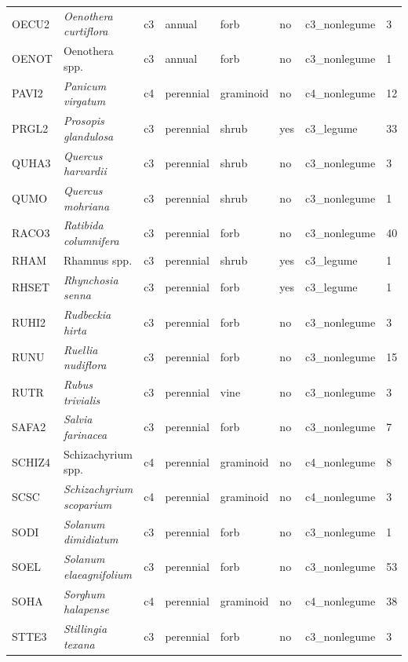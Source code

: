 \begin{landscape}
\begin{table}[]
{\begin{tabular}{p{2cm}p{5cm}p{2cm}p{2cm}p{2cm}p{2cm}p{3.5cm}p{2cm}}
        OECU2  & \textit{Oenothera curtiflora}      & c3 & annual    & forb           & no  & c3\_nonlegume & 3  \\
        OENOT  & Oenothera spp.                     & c3 & annual    & forb           & no  & c3\_nonlegume & 1  \\
        PAVI2  & \textit{Panicum virgatum}          & c4 & perennial & graminoid      & no  & c4\_nonlegume & 12 \\
        PRGL2  & \textit{Prosopis glandulosa}       & c3 & perennial & shrub          & yes & c3\_legume    & 33 \\
        QUHA3  & \textit{Quercus harvardii}         & c3 & perennial & shrub          & no  & c3\_nonlegume & 3  \\
        QUMO   & \textit{Quercus mohriana}          & c3 & perennial & shrub          & no  & c3\_nonlegume & 1  \\
        RACO3  & \textit{Ratibida columnifera}      & c3 & perennial & forb           & no  & c3\_nonlegume & 40 \\
        RHAM   & Rhamnus spp.                       & c3 & perennial & shrub          & yes & c3\_legume    & 1  \\
        RHSET  & \textit{Rhynchosia senna}          & c3 & perennial & forb           & yes & c3\_legume    & 1  \\
        RUHI2  & \textit{Rudbeckia hirta}           & c3 & perennial & forb           & no  & c3\_nonlegume & 3  \\
        RUNU   & \textit{Ruellia nudiflora}         & c3 & perennial & forb           & no  & c3\_nonlegume & 15 \\
        RUTR   & \textit{Rubus trivialis}           & c3 & perennial & vine           & no  & c3\_nonlegume & 3  \\
        SAFA2  & \textit{Salvia farinacea}          & c3 & perennial & forb           & no  & c3\_nonlegume & 7  \\
        SCHIZ4 & Schizachyrium spp.                 & c4 & perennial & graminoid      & no  & c4\_nonlegume & 8  \\
        SCSC   & \textit{Schizachyrium scoparium}   & c4 & perennial & graminoid      & no  & c4\_nonlegume & 3  \\
        SODI   & \textit{Solanum dimidiatum}        & c3 & perennial & forb           & no  & c3\_nonlegume & 1  \\
        SOEL   & \textit{Solanum elaeagnifolium}    & c3 & perennial & forb           & no  & c3\_nonlegume & 53 \\
        SOHA   & \textit{Sorghum halapense}         & c4 & perennial & graminoid      & no  & c4\_nonlegume & 38 \\
        STTE3  & \textit{Stillingia texana}         & c3 & perennial & forb           & no  & c3\_nonlegume & 3  \\
        \hline
    \end{tabular}}
\end{table}
\end{landscape}
\clearpage

